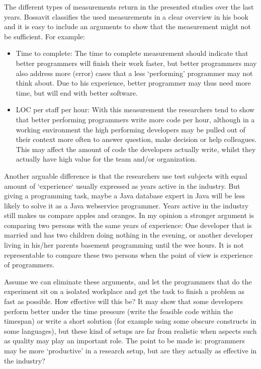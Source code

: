 The different types of measurements return in the presented studies over the last years.
Bossavit classifies the used measurements in a clear overview in his book \autocite[42-43]{bossavit2013leprechauns} and it is easy to include an arguments to show that the measurement might not be sufficient.
For example:
\begin{itemize}[noitemsep]
\item Time to complete:
The time to complete measurement should indicate that better programmers will finish their work faster,
but better programmers may also address more (error) cases that a less `performing' programmer may not think about.
Due to his experience, better programmer may thus need more time, but will end with better software.
\item LOC per staff per hour:
With this measurement the researchers tend to show that better performing programmers write more code per hour,
although in a working environment the high performing developers may be pulled out of their context more often to answer question, make decision or help colleagues.
This may affect the amount of code the developers actually write, whilst they actually have high value for the team and/or organization.
\end{itemize}

Another arguable difference is that the researchers use test subjects with equal amount of `experience` usually expressed as years active in the industry.
But giving a programming task, maybe a Java database expert in Java will be less likely to solve it as a Java webservice programmer.
Years active in the industry still makes us compare apples and oranges.
In my opinion a stronger argument is comparing two persons with the same years of experience:
One developer that is married and has two children doing nothing in the evening,
or another developer living in his/her parents basement programming until the wee hours.
It is not representable to compare these two persons when the point of view is experience of programmers.

Assume we can eliminate these arguments, and let the programmers that do the experiment sit on a isolated workplace and get the task to finish a problem as fast as possible.
How effective will this be?
It may show that some developers perform better under the time pressure (write the feasible code within the timespan) or write a short solution (for example using some obscure constructs in some languages),
but these kind of setups are far from realistic when aspects such as quality may play an important role.
The point to be made is: programmers may be more `productive' in a research setup, but are they actually as effective in the industry?

